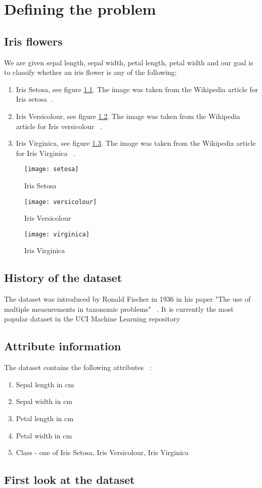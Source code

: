 \chapter{Defining the problem}

\section{Iris flowers}
We are given sepal length, sepal width, petal length, petal width and our goal is to classify whether an iris flower is any of the following:

\begin{enumerate}
    \item Iris Setosa, see figure \ref{fig:setosa}. The image was taken from the Wikipedia article for Iris setosa~\cite{setosa}.
    \item Iris Versicolour, see figure \ref{fig:versicolour}. The image was taken from the Wikipedia article for Iris versicolour ~\cite{versicolor}.
    \item Iris Virginica, see figure \ref{fig:virginica}. The image was taken from the Wikipedia article for Iris Virginica ~\cite{virginica}.
\end{enumerate}
\begin{figure}
    \centering
    \texttt{[image: setosa]}
    \caption{Iris Setosa}
    \label{fig:setosa}
\end{figure}
\begin{figure}
    \centering
    \texttt{[image: versicolour]}
    \caption{Iris Versicolour}
    \label{fig:versicolour}
\end{figure}
\begin{figure}
    \centering
    \texttt{[image: virginica]}
    \caption{Iris Virginica}
    \label{fig:virginica}
\end{figure}

\section{History of the dataset}
The dataset was introduced by Ronald Fischer in 1936 in his paper "The use of multiple measurements in taxonomic problems" ~\cite{setosa}. It is currently the most popular dataset in the UCI Machine Learning repository ~\cite{uci}
\section{Attribute information}
The dataset contains the following attributes ~\cite{iris}:
\begin{enumerate}
    \item Sepal length in cm
    \item Sepal width in cm 
    \item Petal length in cm 
    \item Petal width in cm
    \item Class - one of Iris Setosa, Iris Versicolour, Iris Virginica
\end{enumerate}
\section{First look at the dataset}